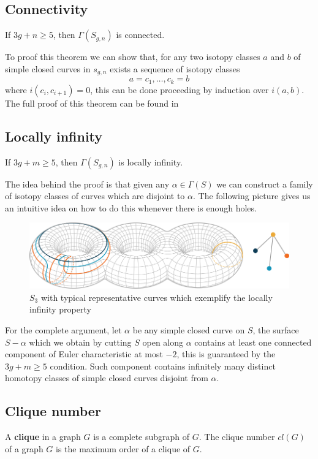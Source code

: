 \subsection{Connectivity}
\begin{theorem}
If $3g+n\geq 5$, then $\Gamma(S_{g,n})$ is connected.
\end{theorem}

To proof this theorem we can show that, for any two isotopy classes $a$ and $b$ of simple closed curves in $s_{g,n}$ exists a sequence of isotopy classes
$$a=c_{1},\dots,c_{k}=b$$
where $i(c_{i},c_{i+1})=0$, this can be done proceeding by induction over $i(a,b)$. The full proof of this theorem can be found in \cite[Farb p.~93]{Farb} 

\subsection{Locally infinity}
\begin{theorem}
If $3g+m\geq 5$, then $\Gamma(S_{g,n})$ is locally infinity.
\end{theorem}
The idea behind the proof is that given any $\alpha \in \Gamma(S)$ we can construct a family of isotopy classes of curves which are disjoint to $\alpha$. The following picture gives us an intuitive idea on how to do this whenever there is enough holes.
\vspace{1cm}
\begin{figure}[h!]
	\centering
	\includegraphics[scale=0.6]{Figures/Locally-infinite.png}
	\caption{$S_{3}$ with typical representative curves which exemplify the locally infinity property}
\end{figure}

For the complete argument, let $\alpha$ be any simple closed curve on $S$, the surface $S-\alpha$ which we obtain by cutting $S$ open along $\alpha$ contains at least one connected component of Euler characteristic at most $-2$, this is guaranteed by the $3g+m\geq 5$ condition. Such component contains infinitely many distinct homotopy classes of simple closed curves disjoint from $\alpha$.

\subsection{Clique number}
A \textbf{clique} in a graph $G$ is a complete subgraph of $G$. The clique number $cl(G)$ of a graph $G$ is the maximum order of a clique of $G$.

